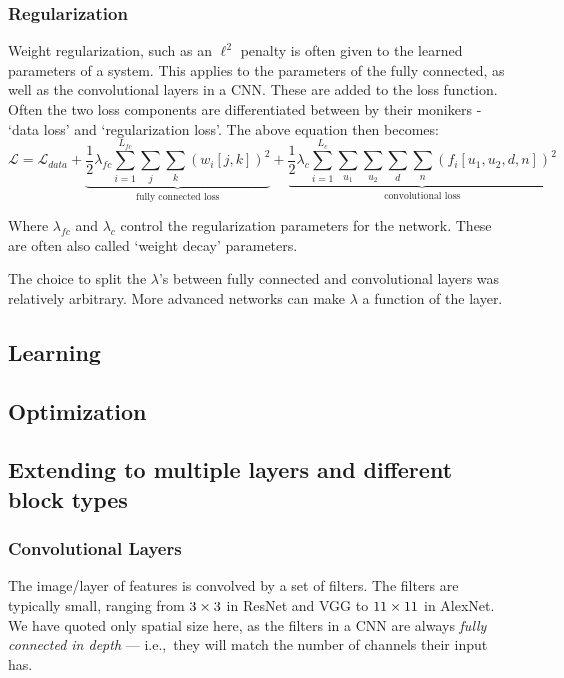 \subsubsection{Regularization}
  Weight regularization, such as an $\ell^2$ penalty is often given to the
  learned parameters of a system. This applies to the parameters of the fully
  connected, as well as the convolutional layers in a CNN\@. These are added to
  the loss function. Often the two loss components are differentiated between by
  their monikers - `data loss' and `regularization loss'. The above 
  equation then becomes:
  \begin{equation}
    \mathcal{L} = \mathcal{L}_{data} + \underbrace{\frac{1}{2}\lambda_{fc}
    \sum_{i=1}^{L_{fc}} \sum_{j} \sum_{k} {(w_{i}[j,k])}^2}_{\text{fully connected
    loss}} +
    \underbrace{\frac{1}{2}\lambda_{c} \sum_{i=1}^{L_c} \sum_{u_1} \sum_{u_2} \sum_{d}
    \sum_{n} \left(f_i[u_1,u_2,d,n]\right)^2}_{\text{convolutional loss}}
  \end{equation}

  Where $\lambda_{fc}$ and $\lambda_{c}$ control the regularization parameters
  for the network. These are often also called `weight decay' parameters.

  The choice to split the $\lambda$'s between fully connected and convolutional
  layers was relatively arbitrary. More advanced networks can make $\lambda$
  a function of the layer. 


\subsection{Learning}

\subsection{Optimization}

\subsection{Extending to multiple layers and different block types}
\begin{figure}
  \centering
  
\end{figure}

\subsubsection{Convolutional Layers}
  The image/layer of features is convolved by a set of filters.
  The filters are typically small, ranging from $3\times 3$ in ResNet and VGG
  to $11\times 11$ in AlexNet. We have quoted only spatial size
  here, as the filters in a CNN are always \emph{fully connected in depth} ---
  i.e.,\ they will match the number of channels their input has.

